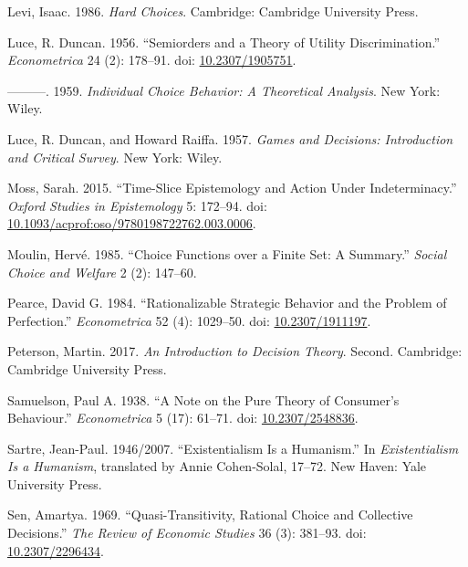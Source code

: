 \documentclass[
  11pt,
  letterpaper,
  DIV=11,
  numbers=noendperiod,
  twoside]{scrartcl}
\newlength{\cslhangindent}
\newenvironment{CSLReferences}[2] %
 {\begin{list}{}{%
  \setlength{\itemindent}{0pt}
  \setlength{\leftmargin}{0pt}
  \setlength{\parsep}{0pt}
  \ifodd #1
   \setlength{\leftmargin}{\cslhangindent}
   \setlength{\itemindent}{-1\cslhangindent}
  \fi
  \setlength{\itemsep}{#2\baselineskip}}}
 {\end{list}}
\begin{document}
\begin{CSLReferences}{1}{0}
Levi, Isaac. 1986. \emph{Hard Choices}. Cambridge: Cambridge University
Press.

Luce, R. Duncan. 1956. {``Semiorders and a Theory of Utility
Discrimination.''} \emph{Econometrica} 24 (2): 178--91. doi:
\href{https://doi.org/10.2307/1905751}{10.2307/1905751}.

---------. 1959. \emph{Individual Choice Behavior: A Theoretical
Analysis}. New York: Wiley.

Luce, R. Duncan, and Howard Raiffa. 1957. \emph{Games and Decisions:
Introduction and Critical Survey}. New York: Wiley.

Moss, Sarah. 2015. {``Time-Slice Epistemology and Action Under
Indeterminacy.''} \emph{Oxford Studies in Epistemology} 5: 172--94. doi:
\href{https://doi.org/10.1093/acprof:oso/9780198722762.003.0006}{10.1093/acprof:oso/9780198722762.003.0006}.

Moulin, Hervé. 1985. {``Choice Functions over a Finite Set: A
Summary.''} \emph{Social Choice and Welfare} 2 (2): 147--60.

Pearce, David G. 1984. {``Rationalizable Strategic Behavior and the
Problem of Perfection.''} \emph{Econometrica} 52 (4): 1029--50. doi:
\href{https://doi.org/10.2307/1911197}{10.2307/1911197}.

Peterson, Martin. 2017. \emph{An Introduction to Decision Theory}.
Second. Cambridge: Cambridge University Press.

Samuelson, Paul A. 1938. {``A Note on the Pure Theory of Consumer's
Behaviour.''} \emph{Econometrica} 5 (17): 61--71. doi:
\href{https://doi.org/10.2307/2548836}{10.2307/2548836}.

Sartre, Jean-Paul. 1946/2007. {``Existentialism Is a Humanism.''} In
\emph{Existentialism Is a Humanism}, translated by Annie Cohen-Solal,
17--72. New Haven: Yale University Press.

Sen, Amartya. 1969. {``Quasi-Transitivity, Rational Choice and
Collective Decisions.''} \emph{The Review of Economic Studies} 36 (3):
381--93. doi: \href{https://doi.org/10.2307/2296434}{10.2307/2296434}.


\end{CSLReferences}
\end{document}
